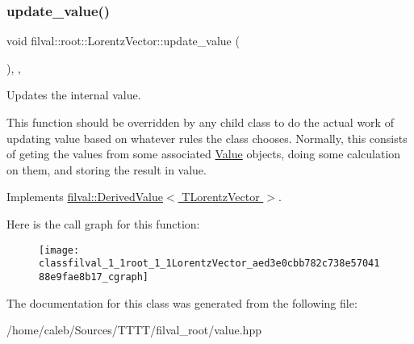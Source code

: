 \subsubsection{\texorpdfstring{update\+\_\+value()}{update\_value()}}
{\footnotesize\ttfamily void filval\+::root\+::\+Lorentz\+Vector\+::update\+\_\+value (\begin{DoxyParamCaption}{ }\end{DoxyParamCaption})\hspace{0.3cm}{\ttfamily [inline]}, {\ttfamily [protected]}, {\ttfamily [virtual]}}



Updates the internal value. 

This function should be overridden by any child class to do the actual work of updating value based on whatever rules the class chooses. Normally, this consists of geting the values from some associated \hyperlink{classfilval_1_1Value}{Value} objects, doing some calculation on them, and storing the result in value. 

Implements \hyperlink{classfilval_1_1DerivedValue_a74e04450a550454510329a9e6b941304}{filval\+::\+Derived\+Value$<$ T\+Lorentz\+Vector $>$}.

Here is the call graph for this function\+:
\nopagebreak
\begin{figure}[H]
\begin{center}
\leavevmode
\texttt{[image: classfilval\_1\_1root\_1\_1LorentzVector\_aed3e0cbb782c738e5704188e9fae8b17\_cgraph]}
\end{center}
\end{figure}


The documentation for this class was generated from the following file\+:\begin{DoxyCompactItemize}
\item 
/home/caleb/\+Sources/\+T\+T\+T\+T/filval\+\_\+root/value.\+hpp\end{DoxyCompactItemize}
